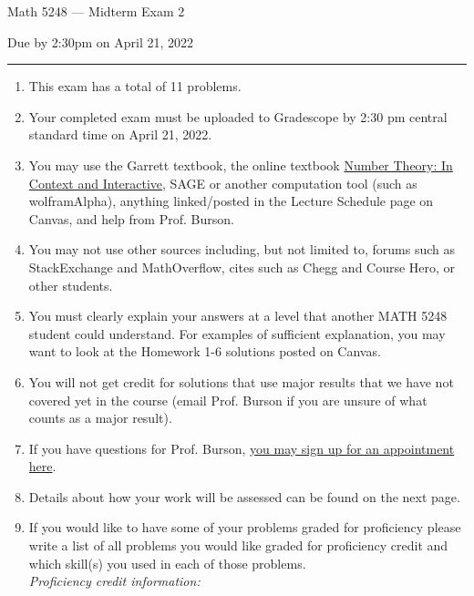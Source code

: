 \documentclass[11pt,addpoints,letterpaper]{exam}
\begin{document}
\vspace*{-0.5in}

\ifprintanswers
\begin{center}
\end{center}
\fi

{\centering

\LARGE Math 5248 --- Midterm Exam 2

}

\smallskip

{\centering

\large Due by 2:30pm on April 21, 2022

}

\bigskip\bigskip


\hrule

\begin{enumerate}[leftmargin=2em,rightmargin=1em]\setlength{\itemsep}{-2pt}


\item This exam has a total of 11 problems. 


\item Your completed exam must be uploaded to Gradescope by 2:30 pm central standard time on April 21, 2022.  

\item You may use the Garrett textbook, the online textbook \href{http://math.gordon.edu/ntic/ntic/frontmatter-1.html}{Number Theory: In Context and Interactive}, SAGE or another computation tool (such as wolframAlpha), anything linked/posted in the Lecture Schedule page on Canvas, and help from Prof. Burson.

\item You may not use other sources including, but not limited to, forums such as StackExchange and MathOverflow, cites such as Chegg and Course Hero, or other students. 

\item You must clearly explain your answers at a level that another MATH 5248 student could understand.  For examples of sufficient explanation, you may  want to look at the Homework 1-6 solutions posted on Canvas.  

\item You will not get credit for solutions that use major results that we have not covered yet in the course (email Prof. Burson if you are unsure of what counts as a major result). 

\item If you have questions for Prof. Burson, \href{https://calendly.com/hburson/meetings-with-dr-burson}{you may sign up for an appointment here}. 

\item Details about how your work will be assessed can be found on the next page. 

\item If you would like to have some of your problems graded for proficiency please write a list of all problems you would like graded for proficiency credit and which skill(s) you used in each of those problems. \\
\emph{Proficiency credit information:}



\end{enumerate}
\end{document}
